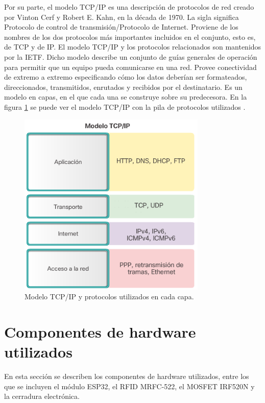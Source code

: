 Por su parte, el modelo TCP/IP es una descripción de protocolos de red creado por Vinton Cerf y Robert E. Kahn, en la década de 1970. La sigla significa Protocolo de control de transmisión/Protocolo de Internet. Proviene de los nombres de los dos protocolos más importantes incluidos en el conjunto, esto es, de TCP y de IP. El modelo TCP/IP y los protocolos relacionados son mantenidos por la IETF. Dicho modelo describe un conjunto de guías generales de operación para permitir que un equipo pueda comunicarse en una red. Provee conectividad de extremo a extremo especificando cómo los datos deberían ser formateados, direccionados, transmitidos, enrutados y recibidos por el destinatario. Es un modelo en capas, en el que cada una se construye sobre su predecesora. En la figura \ref{fig:capasHTTP} se puede ver el modelo TCP/IP con la pila de protocolos utilizados \citep{WEBSITE:CiscoHTTP}.

\begin{figure}[ht]
	\centering
	\includegraphics[width=0.8\textwidth]{./Figures/http.png}
	\caption{Modelo TCP/IP y protocolos utilizados en cada capa.}
	\label{fig:capasHTTP}
\end{figure} 

\pagebreak
\section{Componentes de hardware utilizados}

En esta sección se describen los componentes de hardware utilizados, entre los que se incluyen el módulo ESP32, el RFID MRFC-522, el MOSFET IRF520N y la cerradura electrónica.

